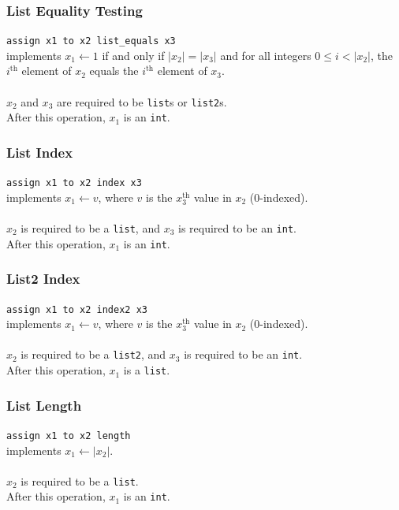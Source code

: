 \documentclass[11pt]{report}
\begin{document}
\subsubsection{List Equality Testing}

\texttt{assign x1 to x2 list\_equals x3} \\
implements $x_1 \leftarrow 1$ if and only if $|x_2| = |x_3|$ and for all integers $0 \le i < |x_2|$, the $i^{\textrm{th}}$ element of $x_2$ equals the $i^{\textrm{th}}$ element of $x_3$. \\ \\
$x_2$ and $x_3$ are required to be \texttt{list}s or \texttt{list2}s. \\
After this operation, $x_1$ is an \texttt{int}. 

\subsubsection{List Index}

\texttt{assign x1 to x2 index x3} \\
implements $x_1 \leftarrow v$, where $v$ is the $x_3^{\textrm{th}}$ value in $x_2$ (0-indexed). \\ \\
$x_2$ is required to be a \texttt{list}, and $x_3$ is required to be an \texttt{int}. \\
After this operation, $x_1$ is an \texttt{int}.

\subsubsection{List2 Index}

\texttt{assign x1 to x2 index2 x3} \\
implements $x_1 \leftarrow v$, where $v$ is the $x_3^{\textrm{th}}$ value in $x_2$ (0-indexed). \\ \\
$x_2$ is required to be a \texttt{list2}, and $x_3$ is required to be an \texttt{int}. \\
After this operation, $x_1$ is a \texttt{list}.

\subsubsection{List Length}

\texttt{assign x1 to x2 length} \\
implements $x_1 \leftarrow |x_2|$. \\ \\ 
$x_2$ is required to be a \texttt{list}. \\
After this operation, $x_1$ is an \texttt{int}.
\end{document}
